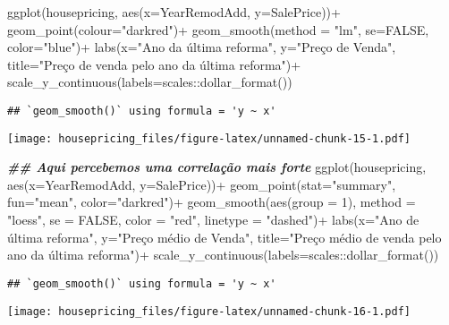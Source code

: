 \documentclass[
]{article}
\newenvironment{Shaded}{\begin{snugshade}}{\end{snugshade}}
\newcommand{\AttributeTok}[1]{\textcolor[rgb]{0.77,0.63,0.00}{#1}}
\newcommand{\ConstantTok}[1]{\textcolor[rgb]{0.00,0.00,0.00}{#1}}
\newcommand{\DecValTok}[1]{\textcolor[rgb]{0.00,0.00,0.81}{#1}}
\newcommand{\DocumentationTok}[1]{\textcolor[rgb]{0.56,0.35,0.01}{\textbf{\textit{#1}}}}
\newcommand{\FunctionTok}[1]{\textcolor[rgb]{0.00,0.00,0.00}{#1}}
\newcommand{\NormalTok}[1]{#1}
\newcommand{\SpecialCharTok}[1]{\textcolor[rgb]{0.00,0.00,0.00}{#1}}
\newcommand{\StringTok}[1]{\textcolor[rgb]{0.31,0.60,0.02}{#1}}
\begin{document}
\begin{Shaded}
\begin{Highlighting}[]
\FunctionTok{ggplot}\NormalTok{(housepricing, }\FunctionTok{aes}\NormalTok{(}\AttributeTok{x=}\NormalTok{YearRemodAdd, }\AttributeTok{y=}\NormalTok{SalePrice))}\SpecialCharTok{+}
  \FunctionTok{geom\_point}\NormalTok{(}\AttributeTok{colour=}\StringTok{"darkred"}\NormalTok{)}\SpecialCharTok{+}
  \FunctionTok{geom\_smooth}\NormalTok{(}\AttributeTok{method =} \StringTok{"lm"}\NormalTok{, }\AttributeTok{se=}\ConstantTok{FALSE}\NormalTok{, }\AttributeTok{color=}\StringTok{"blue"}\NormalTok{)}\SpecialCharTok{+}
  \FunctionTok{labs}\NormalTok{(}\AttributeTok{x=}\StringTok{"Ano da última reforma"}\NormalTok{, }\AttributeTok{y=}\StringTok{"Preço de Venda"}\NormalTok{, }\AttributeTok{title=}\StringTok{"Preço de venda pelo ano da última reforma"}\NormalTok{)}\SpecialCharTok{+}
  \FunctionTok{scale\_y\_continuous}\NormalTok{(}\AttributeTok{labels=}\NormalTok{scales}\SpecialCharTok{::}\FunctionTok{dollar\_format}\NormalTok{())}
\end{Highlighting}
\end{Shaded}

\begin{verbatim}
## `geom_smooth()` using formula = 'y ~ x'
\end{verbatim}

\texttt{[image: housepricing\_files/figure-latex/unnamed-chunk-15-1.pdf]}

\begin{Shaded}
\begin{Highlighting}[]
\DocumentationTok{\#\# Aqui percebemos uma correlação mais forte}
\FunctionTok{ggplot}\NormalTok{(housepricing, }\FunctionTok{aes}\NormalTok{(}\AttributeTok{x=}\NormalTok{YearRemodAdd, }\AttributeTok{y=}\NormalTok{SalePrice))}\SpecialCharTok{+}
  \FunctionTok{geom\_point}\NormalTok{(}\AttributeTok{stat=}\StringTok{"summary"}\NormalTok{, }\AttributeTok{fun=}\StringTok{"mean"}\NormalTok{, }\AttributeTok{color=}\StringTok{"darkred"}\NormalTok{)}\SpecialCharTok{+}
  \FunctionTok{geom\_smooth}\NormalTok{(}\FunctionTok{aes}\NormalTok{(}\AttributeTok{group =} \DecValTok{1}\NormalTok{), }\AttributeTok{method =} \StringTok{"loess"}\NormalTok{, }\AttributeTok{se =} \ConstantTok{FALSE}\NormalTok{, }\AttributeTok{color =} \StringTok{"red"}\NormalTok{, }\AttributeTok{linetype =} \StringTok{"dashed"}\NormalTok{)}\SpecialCharTok{+}
  \FunctionTok{labs}\NormalTok{(}\AttributeTok{x=}\StringTok{"Ano de última reforma"}\NormalTok{, }\AttributeTok{y=}\StringTok{"Preço médio de Venda"}\NormalTok{, }\AttributeTok{title=}\StringTok{"Preço médio de venda pelo ano da última reforma"}\NormalTok{)}\SpecialCharTok{+}
  \FunctionTok{scale\_y\_continuous}\NormalTok{(}\AttributeTok{labels=}\NormalTok{scales}\SpecialCharTok{::}\FunctionTok{dollar\_format}\NormalTok{())}
\end{Highlighting}
\end{Shaded}

\begin{verbatim}
## `geom_smooth()` using formula = 'y ~ x'
\end{verbatim}

\texttt{[image: housepricing\_files/figure-latex/unnamed-chunk-16-1.pdf]}
\end{document}

